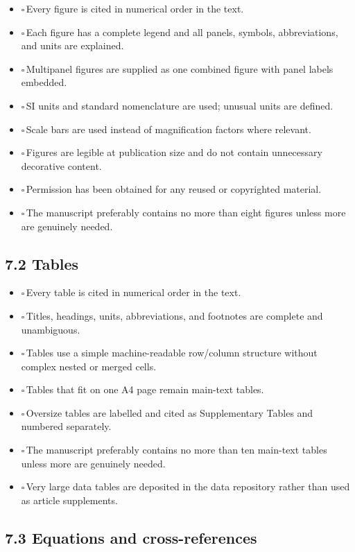 \documentclass[11pt]{article}
\newcommand{\cbox}{$\square$\,}
\begin{document}
\begin{itemize}
    \item \cbox Every figure is cited in numerical order in the text.
    \item \cbox Each figure has a complete legend and all panels, symbols, abbreviations, and units are explained.
    \item \cbox Multipanel figures are supplied as one combined figure with panel labels embedded.
    \item \cbox SI units and standard nomenclature are used; unusual units are defined.
    \item \cbox Scale bars are used instead of magnification factors where relevant.
    \item \cbox Figures are legible at publication size and do not contain unnecessary decorative content.
    \item \cbox Permission has been obtained for any reused or copyrighted material.
    \item \cbox The manuscript preferably contains no more than eight figures unless more are genuinely needed.
\end{itemize}

\subsection*{7.2 Tables}

\begin{itemize}
    \item \cbox Every table is cited in numerical order in the text.
    \item \cbox Titles, headings, units, abbreviations, and footnotes are complete and unambiguous.
    \item \cbox Tables use a simple machine-readable row/column structure without complex nested or merged cells.
    \item \cbox Tables that fit on one A4 page remain main-text tables.
    \item \cbox Oversize tables are labelled and cited as Supplementary Tables and numbered separately.
    \item \cbox The manuscript preferably contains no more than ten main-text tables unless more are genuinely needed.
    \item \cbox Very large data tables are deposited in the data repository rather than used as article supplements.
\end{itemize}

\subsection*{7.3 Equations and cross-references}
\end{document}
